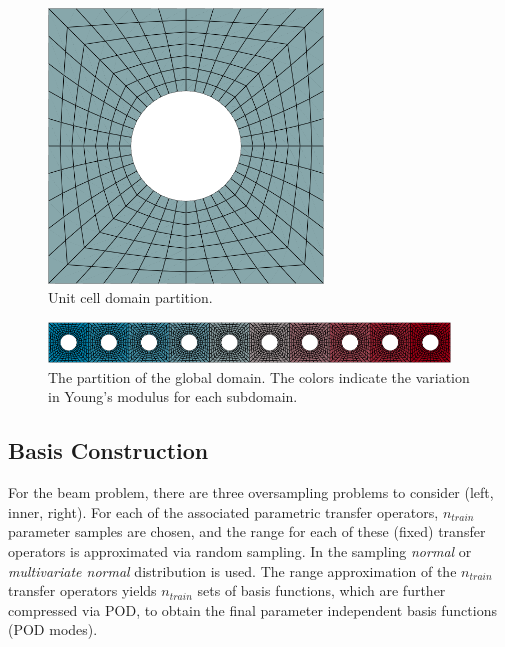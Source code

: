 \documentclass[a4paper]{eccomas_paper-2024}
\begin{document}
\begin{figure}
    \begin{center}
        \includegraphics[width=0.65\textwidth]{./figures/beam/unit_cell.png}
    \end{center}
    \caption{Unit cell domain partition.}\label{fig:unit_cell_domain}
\end{figure}

\begin{figure}
    \begin{center}
        \includegraphics[width=0.95\textwidth]{./figures/beam/global_domain.png}
    \end{center}
    \caption{The partition of the global domain. The colors indicate the variation in Young's modulus for each subdomain.}\label{fig:global_domain}
\end{figure}

\subsection{Basis Construction}
For the beam problem, there are three oversampling problems to consider (left, inner, right).
For each of the associated parametric transfer operators, $n_{train}$ parameter samples are chosen, and
the range for each of these (fixed) transfer operators is approximated via random sampling. In
the sampling \textit{normal} or \textit{multivariate normal} distribution is used.
The range approximation of the $n_{train}$ transfer operators yields $n_{train}$ sets of
basis functions, which are further compressed via POD, to obtain the final parameter
independent basis functions (POD modes).
\end{document}
